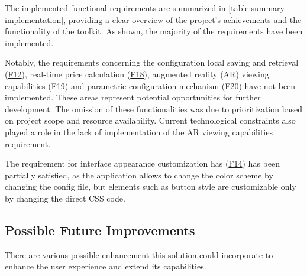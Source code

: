The implemented functional requirements are summarized in \autoref{table:summary-implementation}, providing a clear overview of the project's achievements and the functionality of the toolkit. As shown, the majority of the requirements have been implemented.

Notably, the requirements concerning the configuration local saving and retrieval (\hyperref[itm:F12]{F12}), real-time price calculation (\hyperref[itm:F18]{F18}), augmented reality (AR) viewing capabilities (\hyperref[itm:F19]{F19}) and parametric configuration mechanism (\hyperref[itm:F20]{F20}) have not been implemented. These areas represent potential opportunities for further development. The omission of these functionalities was due to prioritization based on project scope and resource availability. Current technological constraints also played a role in the lack of implementation of the AR viewing capabilities requirement.

The requirement for interface appearance customization has (\hyperref[itm:F14]{F14}) has been partially satisfied, as the application allows to change the color scheme by changing the config file, but elements such as button style are customizable only by changing the direct CSS code.

\subsection{Possible Future Improvements} \label{section:improvements}

There are various possible enhancement this solution could incorporate to enhance the user experience and extend its capabilities.

